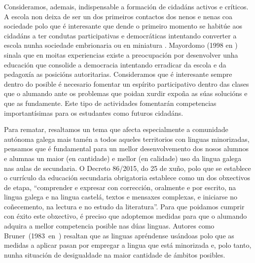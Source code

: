 Consideramos, ademais, indispensable a formación de cidadáns activos e críticos. A escola non deixa de ser un dos primeiros contactos dos nenos e nenas coa sociedade polo que é interesante que dende o primeiro momento se habitúe aos cidadáns a ter condutas participativas e democráticas intentando converter a escola nunha sociedade embrionaria ou en miniatura \cite{diazrelaciones}. Mayordomo (1998 en ) sinala que en moitas experiencias existe a preocupación por desenvolver unha educación que consolide a democracia intentando erradicar da escola e da pedagoxía as posicións autoritarias. Consideramos que é interesante sempre dentro do posible é necesario fomentar un espírito participativo dentro das clases que o alumando ante os problemas que poidan xurdir expoña as súas solucións e que as fundamente. Este tipo de actividades fomentarán competencias importantísimas para os estudantes como futuros cidadáns.

Para rematar, resaltamos un tema que afecta especialmente a comunidade autónoma galega mais tamén a todos aqueles territorios con linguas minorizadas, pensamos que é fundamental para un mellor desenvolvemento dos nosos alumnos e alumnas un maior (en cantidade) e mellor (en calidade) uso da lingua galega nas aulas de secundaria. O Decreto 86/2015, do 25 de xuño, polo que se establece o currículo da educación secundaria obrigatoria establece como un dos obxectivos de etapa, ``comprender e expresar con corrección, oralmente e por escrito, na lingua galega e na lingua castelá, textos e mensaxes complexas, e iniciarse no coñecemento, na lectura e no estudo da literatura''.  Para que poidamos cumprir con éxito este obxectivo, é preciso que adoptemos medidas para que o alumando adquira a mellor competencia posible nas dúas linguas. Autores como Bruner~(1983~en~) resaltan que as linguas apréndense usándoas polo que  as medidas a aplicar pasan por empregar a lingua que está minorizada e, polo tanto, nunha situación de desigualdade na maior cantidade de ámbitos posibles.
